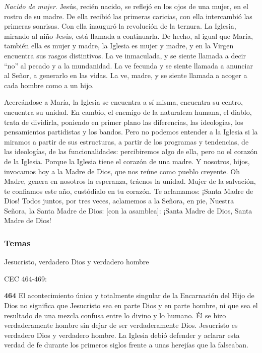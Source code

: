 \documentclass[]{article}
\begin{document}
\emph{Nacido de mujer}. Jesús, recién nacido, se reflejó en los ojos de
una mujer, en el rostro de su madre. De ella recibió las primeras
caricias, con ella intercambió las primeras sonrisas. Con ella inauguró
la revolución de la ternura. La Iglesia, mirando al niño Jesús, está
llamada a continuarla. De hecho, al igual que María, también ella es
mujer y madre, la Iglesia es mujer y madre, y en la Virgen encuentra sus
rasgos distintivos. La ve inmaculada, y se siente llamada a decir ``no''
al pecado y a la mundanidad. La ve fecunda y se siente llamada a
anunciar al Señor, a generarlo en las vidas. La ve, madre, y se siente
llamada a acoger a cada hombre como a un hijo.

Acercándose a María, la Iglesia se encuentra a sí misma, encuentra su
centro, encuentra su unidad. En cambio, el enemigo de la naturaleza
humana, el diablo, trata de dividirla, poniendo en primer plano las
diferencias, las ideologías, los pensamientos partidistas y los bandos.
Pero no podemos entender a la Iglesia si la miramos a partir de sus
estructuras, a partir de los programas y tendencias, de las ideologías,
de las funcionalidades: percibiremos algo de ella, pero no el corazón de
la Iglesia. Porque la Iglesia tiene el corazón de una madre. Y nosotros,
hijos, invocamos hoy a la Madre de Dios, que nos reúne como pueblo
creyente. Oh Madre, genera en nosotros la esperanza, tráenos la unidad.
Mujer de la salvación, te confiamos este año, custódialo en tu corazón.
Te aclamamos: ¡Santa Madre de Dios! Todos juntos, por tres veces,
aclamemos a la Señora, en pie, Nuestra Señora, la Santa Madre de Dios:
{[}con la asamblea{]}: ¡Santa Madre de Dios, Santa Madre de
Dios!\protect\hypertarget{_Ref448598744}{}{\protect\hypertarget{_Toc448662845}{}{\protect\hypertarget{_Toc448690364}{}{}}}



\subsubsection{Temas}\label{temas-9}

Jesucristo, verdadero Dios y verdadero hombre

CEC 464-469:  

\textbf{464} El acontecimiento único y totalmente singular de la
Encarnación del Hijo de Dios no significa que Jesucristo sea en parte
Dios y en parte hombre, ni que sea el resultado de una mezcla confusa
entre lo divino y lo humano. Él se hizo verdaderamente hombre sin dejar
de ser verdaderamente Dios. Jesucristo es verdadero Dios y verdadero
hombre. La Iglesia debió defender y aclarar esta verdad de fe durante
los primeros siglos frente a unas herejías que la falseaban.
\end{document}
